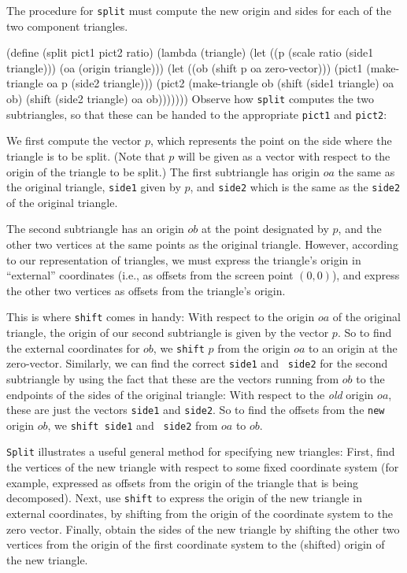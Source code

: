 The procedure for {\tt split} must compute the new origin and sides for
each of the two component triangles.

\beginlisp
(define (split pict1 pict2 ratio)
  (lambda (triangle)
    (let ((p (scale ratio (side1 triangle)))
          (oa (origin triangle)))
      (let ((ob (shift p oa zero-vector)))
        (pict1 (make-triangle oa p (side2 triangle)))
        (pict2 (make-triangle ob
                              (shift (side1 triangle) oa ob)
                              (shift (side2 triangle) oa ob)))))))
\endlisp
Observe how {\tt split} computes the two subtriangles, so that these can
be handed to the appropriate {\tt pict1} and {\tt pict2}:

We first compute the vector $p$, which represents the point on the
side where the triangle is to be split.  (Note that $p$ will be given
as a vector with respect to the origin of the triangle to be split.)
The first subtriangle has origin $oa$ the same as the original
triangle, {\tt side1} given by $p$, and {\tt side2} which is the same
as the {\tt side2} of the original triangle.

The second subtriangle has an origin $ob$ at the point designated by
$p$, and the other two vertices at the same points as the original
triangle.  However, according to our representation of triangles, we
must express the triangle's origin in ``external'' coordinates (i.e.,
as offsets from the screen point $(0,0)$), and express the other two
vertices as offsets from the triangle's origin.

This is where {\tt shift} comes in handy: With respect to the origin
$oa$ of the original triangle, the origin of our second subtriangle is
given by the vector $p$.  So to find the external coordinates for
$ob$, we {\tt shift} $p$ from the origin $oa$ to an origin at the
zero-vector.  Similarly, we can find the correct {\tt side1} and {\tt
side2} for the second subtriangle by using the fact that these are the
vectors running from $ob$ to the endpoints of the sides of the
original triangle: With respect to the {\em old} origin $oa$, these
are just the vectors {\tt side1} and {\tt side2}.  So to find the
offsets from the {\tt new} origin $ob$, we {\tt shift side1} and {\tt
side2} from $oa$ to $ob$.

{\tt Split} illustrates a useful general method for specifying new
triangles: First, find the vertices of the new triangle with respect
to some fixed coordinate system (for example, expressed as offsets
from the origin of the triangle that is being decomposed).  Next, use
{\tt shift} to express the origin of the new triangle in external
coordinates, by shifting from the origin of the coordinate system to
the zero vector.  Finally, obtain the sides of the new triangle by
shifting the other two vertices from the origin of the first
coordinate system to the (shifted) origin of the new triangle.

